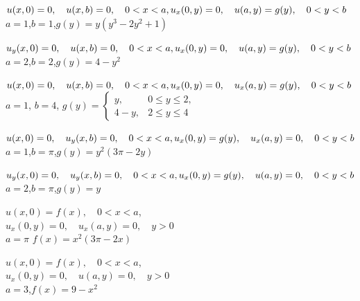 \begin{exerciselist}
  \item\label{exer:12.3.24} $u(x,0)=0,\quad u(x,b)=0,\quad0<x<a,\\ u_{x}(0,y)=0,\quad u(a,y)=g(y),\quad0<y<b$ \\ $a=1$,\quad $b=1$,\quad $g(y)=y(y^{3}-2y^{2}+1)$

  \item\label{exer:12.3.25} \Cex $u_{y}(x,0)=0,\quad u(x,b)=0,\quad0<x<a,\\ u_{x}(0,y)=0,\quad u(a,y)=g(y),\quad0<y<b$ \\ $a=2$,\quad $b=2$,\quad $g(y)=4-y^{2}$

  \item\label{exer:12.3.26} $u(x,0)=0,\quad u(x,b)=0,\quad0<x<a,\\ u_{x}(0,y)=0,\quad u_{x}(a,y)=g(y),\quad0<y<b$ \\ $a=1$, $b=4$, $g(y)= \left\{
  \begin{array}{cl}
    y,   & 0\le y\le2, \\
    4-y, & 2\le y\le4
  \end{array}\right.$

  \item\label{exer:12.3.27} $u(x,0)=0,\quad u_{y}(x,b)=0,\quad0<x<a,\\ u_{x}(0,y)=g(y),\quad u_{x}(a,y)=0,\quad0<y<b$ \\ $a=1$,\quad $b=\pi$,\quad $g(y)=y^{2}(3\pi-2y)$

  \item\label{exer:12.3.28} $u_{y}(x,0)=0,\quad u_{y}(x,b)=0,\quad0<x<a,\\ u_{x}(0,y)=g(y),\quad u(a,y)=0,\quad0<y<b$ \\ $a=2$,\quad $b=\pi$,\quad $g(y)=y$


  \item\label{exer:12.3.29} $u(x,0)=f(x),\quad0<x<a$,\quad\\ $u_{x}(0,y)=0,\quad u_{x}(a,y)=0,\quad y>0$ \\ $a=\pi$ $f(x)=x^{2}(3\pi-2x)$

  \item\label{exer:12.3.30} $u(x,0)=f(x),\quad0<x<a$,\\ $u_{x}(0,y)=0,\quad u(a,y)=0,\quad y>0$ \\ $a=3$,\quad $f(x)=9-x^{2}$


\end{exerciselist}
